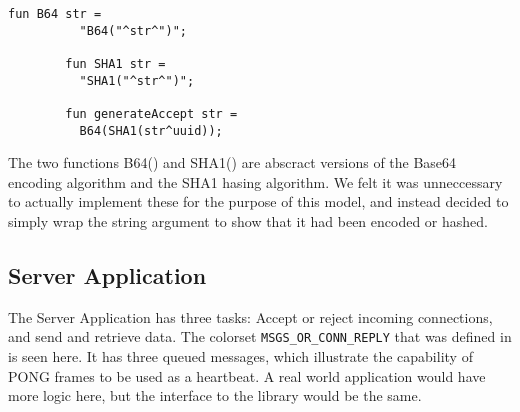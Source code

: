 		
		\begin{lstlisting}[label=lst:generateAccept,caption=generateAccept,gobble=2]
		fun B64 str =
		  "B64("^str^")";
		
		fun SHA1 str =
		  "SHA1("^str^")";

		fun generateAccept str =
		  B64(SHA1(str^uuid));
		\end{lstlisting}
		
		The two functions B64() \cite{rfc4648} and SHA1() \cite{fips.180-2} are
		abscract versions of the Base64 encoding algorithm and the SHA1 hasing algorithm. We felt it was unneccessary
		to actually implement these for the purpose of this model, and instead decided
		to simply wrap the string argument to show that it had been encoded or hashed.
		
\subsection{Server Application}
	
	
	The Server Application has three tasks: Accept or reject incoming connections,
	and send and retrieve data. The colorset \lstinline:MSGS_OR_CONN_REPLY: that
	was defined in  is seen here. It has three
	queued messages, which illustrate the capability of PONG frames to be used as
	a heartbeat. A real world application would have more logic here, but the
	interface to the library would be the same.
